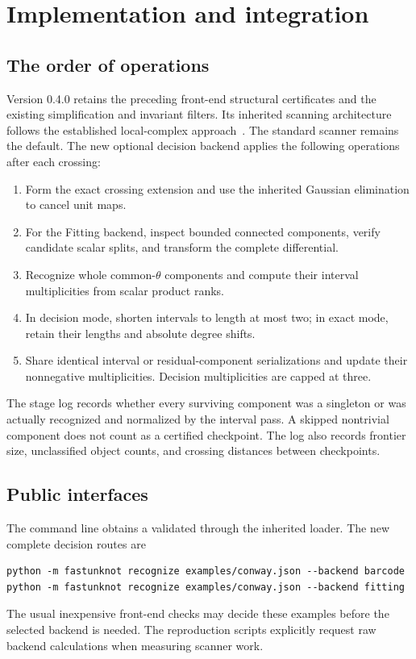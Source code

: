 \section{Implementation and integration}
\label{sec:implementation}

\subsection{The order of operations}
Version 0.4.0 retains the preceding front-end structural certificates and
the existing simplification and invariant filters. Its inherited scanning
architecture follows the established local-complex approach~\cite{bnfast}. The standard scanner
remains the default. The new optional decision backend applies the following
operations after each crossing:
\begin{enumerate}
\item Form the exact crossing extension and use the inherited Gaussian
elimination to cancel unit maps.
\item For the Fitting backend, inspect bounded connected components, verify
candidate scalar splits, and transform the complete differential.
\item Recognize whole common-$\theta$ components and compute their interval
multiplicities from scalar product ranks.
\item In decision mode, shorten intervals to length at most two; in exact
mode, retain their lengths and absolute degree shifts.
\item Share identical interval or residual-component serializations and
update their nonnegative multiplicities. Decision multiplicities are capped
at three.
\end{enumerate}
The stage log records whether every surviving component was a singleton or
was actually recognized and normalized by the interval pass. A skipped
nontrivial component does not count as a certified checkpoint. The log also
records frontier size, unclassified object counts, and crossing distances
between checkpoints.

\subsection{Public interfaces}
The command line obtains a validated  through the inherited
loader. The new complete decision routes are
\begin{lstlisting}
python -m fastunknot recognize examples/conway.json --backend barcode
python -m fastunknot recognize examples/conway.json --backend fitting
\end{lstlisting}
The usual inexpensive front-end checks may decide these examples before the
selected backend is needed. The reproduction scripts explicitly request raw
backend calculations when measuring scanner work.

